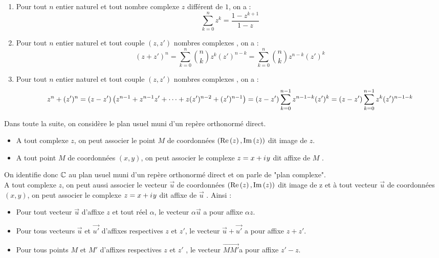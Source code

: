\begin{defprop}
	\begin{enumerate}
		\item Pour tout \(n\) entier naturel et tout nombre complexe \(z\) différent de \(1\), on a :
		      \[\sum_{k=0}^n z^k = \frac{1-z^{k+1}}{1-z}\]
		\item Pour tout \(n\) entier naturel et tout couple \((z,z')\) nombres complexes , on a :
		      \[(z+z')^n = \sum_{k=0}^{n}\binom{n}{k}z^k(z')^{n-k} = \sum_{k=0}^{n}\binom{n}{k}z^{n-k}(z')^k\]
		\item Pour tout \(n\) entier naturel et tout couple \((z,z')\) nombres complexes , on a :
		      \[z^n+(z')^n = (z-z')\left(z^{n-1}+z^{n-1}z'+\dots+z(z')^{n-2}+(z')^{n-1}\right) = (z-z')\sum_{k=0}^{n-1} z^{n-1-k}(z')^{k} =(z-z')\sum_{k=0}^{n-1} z^{k}(z')^{n-1-k} \]
	\end{enumerate}
\end{defprop}

\begin{defprop}
	Dans toute la suite, on considère le plan usuel muni d’un repère orthonormé direct.
	\begin{itemize}
		\item A tout complexe \(z\), on peut associer le point \(M\) de coordonnées \((\operatorname{Re}\left(z\right), \operatorname{Im}\left(z\right))\) dit image de \(z\).
		\item A tout point \(M\) de coordonnées \((x, y)\), on peut associer le complexe \(z = x + i\mkern1mu y\) dit affixe de \(M\) .
	\end{itemize}
	On identifie donc \(\mathbb{C}\) au plan usuel muni d’un repère orthonormé direct et on parle de "plan complexe". \\

	A tout complexe \(z\), on peut aussi associer le vecteur \(\vec{u}\) de coordonnées \((\operatorname{Re}\left(z\right), \operatorname{Im}\left(z\right))\) dit image de z et à tout vecteur  \(\vec{u}\) de coordonnées \((x, y)\), on peut associer le complexe \( z = x + i\mkern1mu y\) dit affixe de  \(\vec{u}\) . Ainsi :
	\begin{itemize}
		\item Pour tout vecteur  \(\vec{u}\) d’affixe \(z\) et tout réel \(\alpha\), le vecteur \(\alpha \vec{u}\) a pour affixe \(\alpha z\). \\
		\item Pour tous vecteurs \(\vec{u}\) et \(\vec{u'}\) d’affixes respectives \(z\) et \(z'\), le vecteur \(\vec{u} + \vec{u'} \) a pour affixe \(z + z'\). \\
		\item Pour tous points \(M\) et \(M '\) d’affixes respectives \(z\) et \(z'\) , le vecteur \(\vec{MM'}\)a pour affixe \(z' - z\).
	\end{itemize}
\end{defprop}

